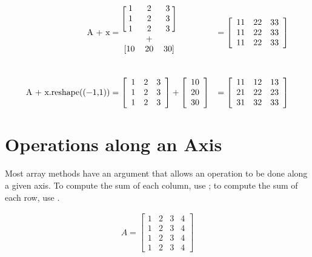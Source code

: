 \begin{align*}
\text{\li{A + x}}
&= \begin{blockarray}{ccc}
\begin{block}{[ccc]}
1 & 2 & 3\\
1 & 2 & 3\\
1 & 2 & 3\\
\end{block}
  & + &  \\
\begin{block}{[ccc]}
10 & 20 & 30\\
\end{block}
\end{blockarray}
&= \left[\begin{array}{ccc}
11 & 22 & 33\\
11 & 22 & 33\\
11 & 22 & 33
\end{array}\right]
\\ \\
\text{\li{A + x.reshape((-1,1))}}
&= \left[\begin{array}{ccc}
1 & 2 & 3 \\
1 & 2 & 3 \\
1 & 2 & 3 \\
\end{array}\right]
+ \left[\begin{array}{c}
10 \\ 20 \\ 30\\
\end{array}\right]
&= \left[\begin{array}{ccc}
11 & 12 & 13\\
21 & 22 & 23\\
31 & 32 & 33\\
\end{array}\right]
\end{align*}

\section*{Operations along an Axis} %

Most array methods have an  argument that allows an operation to be done along a given axis.
To compute the sum of each column, use ; to compute the sum of each row, use .

\begin{align*}
A = \left[\begin{array}{cccc}
1 & 2 & 3 & 4\\
1 & 2 & 3 & 4\\
1 & 2 & 3 & 4\\
1 & 2 & 3 & 4
\end{array}\right]
\end{align*}


